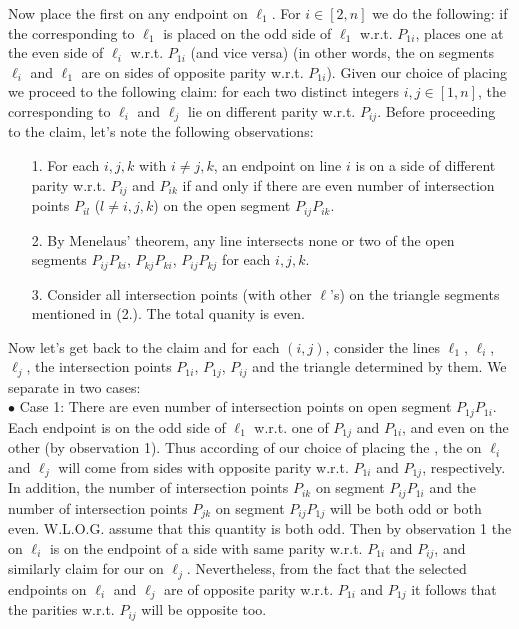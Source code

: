 \documentclass[11pt,a4paper]{article}
\begin{document}
\begin{itemize}
Now place the first \animal  on any endpoint on $\ell_1$. For $i\in [2, n]$ we do the following: 
if the \animal corresponding to $\ell_1$ is placed on the odd side of $\ell_1$ w.r.t. $P_{1i}$, 
\person places one \animal at the even side of $\ell_i$ w.r.t. $P_{1i}$ (and vice versa) 
(in other words, the \animals on segments $\ell_i$ and $\ell_1$ are on sides of opposite parity w.r.t. $P_{1i}$). 
Given our choice of placing \animals we proceed to the following claim: 
for each two distinct integers $i, j\in [1, n]$, 
the \animals corresponding to $\ell_i$ and $\ell_j$ lie on different parity w.r.t. $P_{ij}$. 
Before proceeding to the claim, let's note the following observations: 
\begin{itemize}
\item[1.] For each $i, j, k$ with $i\neq j, k$, an endpoint on line $i$ is on a side of different parity w.r.t. $P_{ij}$ and $P_{ik}$ if and only if there are even number of intersection points $P_{il}$ ($l\neq i, j, k$) on the open segment $P_{ij}P_{ik}$.
\item[2.] By Menelaus' theorem, any line intersects none or two of the open segments 
$P_{ij}P_{ki}$, $P_{kj}P_{ki}$, $P_{ij}P_{kj}$ for each $i, j, k$.
\item[3.] Consider all intersection points (with other $\ell$'s) on the triangle segments mentioned in (2.). The total quanity is even.
\end{itemize}
Now let's get back to the claim and for each $(i, j)$, consider the lines $\ell_1$, $\ell_i$, $\ell_j$, the intersection points $P_{1i}$, $P_{1j}$, $P_{ij}$ and the triangle determined by them. We separate in two cases:\\
$\bullet$ Case 1: There are even number of intersection points on open segment $P_{1j}P_{1i}$.\\ 
Each endpoint is on the odd side of $\ell_1$ w.r.t. one of $P_{1j}$ and $P_{1i}$, and even on the other (by observation 1). 
Thus according of our choice of placing the \animals, 
the \animals on $\ell_i$ and $\ell_j$ will come from sides with opposite parity w.r.t. $P_{1i}$ and $P_{1j}$, respectively.
In addition, the number of intersection points $P_{ik}$ on segment $P_{ij}P_{1i}$ and the number of intersection points $P_{jk}$ on segment $P_{ij}P_{1j}$ will be both odd or both even. 
W.L.O.G. assume that this quantity is both odd.
Then by observation 1 the \animal on $\ell_i$ is on the endpoint of a side with same parity w.r.t. $P_{1i}$ and $P_{ij}$, and similarly claim for our \animal on $\ell_j$. 
Nevertheless, from the fact that the selected endpoints on $\ell_i$ and $\ell_j$ are of opposite parity w.r.t. $P_{1i}$ and $P_{1j}$ it follows that the parities w.r.t. $P_{ij}$ will be opposite too. 

\end{itemize}
\end{document}
